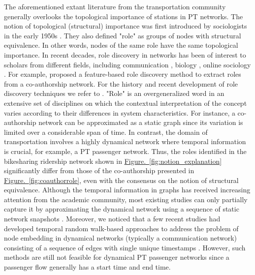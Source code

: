 \documentclass[a4paper,fleqn]{cas-sc}
\begin{document}
The aforementioned extant literature from the transportation community generally overlooks the topological importance of stations in PT networks. The notion of topological (structural) importance was first introduced by sociologists in the early 1950s \citep{parsons1951illness,merton1968social}. They also defined "role" as groups of nodes with structural equivalence. In other words, nodes of the same role have the same topological importance. In recent decades, 
role discovery in networks has been of interest to scholars from different fields, including communication \citep{mahadevan2006internet}, biology \citep{varki1993biological,helenius2004roles}, online sociology \citep{scripps2007node}. For example, \cite{henderson2012rolx} proposed a feature-based role discovery method to extract roles from a co-authorship network. For the history and recent development of role discovery techniques we refer to \cite{rossi2014role}. "Role" is an overgeneralized word in an extensive set of disciplines on which the contextual interpretation of the concept varies according to their differences in system characteristics. For instance, a co-authorship network can be approximated as a static graph since its variation is limited over a considerable span of time. In contrast, the domain of transportation involves a highly dynamical network where temporal information is crucial, for example, a PT passenger network. Thus, the roles identified in the bikesharing ridership network shown in \hyperref[fig:notion_explanation]{Figure.~\ref{fig:notion_explanation}} significantly differ from those of the co-authorship presented in \hyperref[fig:coauthorrole]{Figure.~\ref{fig:coauthorrole}}, even with the consensus on the notion of structural equivalence. Although the temporal information in graphs has received increasing attention from the academic community, most existing studies can only partially capture it by approximating the dynamical network using a sequence of static network snapshots \citep{rossi2012role, rossi2013modeling, saha2018models}. Moreover, we noticed that a few recent studies had developed temporal random walk-based approaches to address the problem of node embedding in dynamical networks (typically a communication network) consisting of a sequence of edges with single unique timestamps \citep{beres2019node,lee2020dynamic}. However, such methods are still not feasible for dynamical PT passenger networks since a passenger flow generally has a start time and end time.
\end{document}
